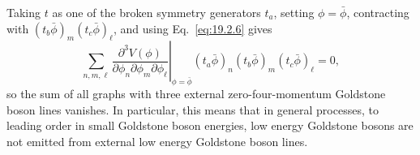 Taking $t$ as one of the broken symmetry generators $t_a$, setting
$\phi=\bar\phi$, contracting with
$(t_b\bar\phi)_m(t_c\bar\phi)_\ell$, and using
Eq.~\eqref{eq:19.2.6} gives
\begin{equation}
 \left.
 \sum_{n,m,\ell}
 \frac{\partial^3V(\phi)}
 {\partial\phi_n\partial\phi_m\partial\phi_\ell}
 \right|_{\phi=\bar\phi}
 (t_a\bar\phi)_n(t_b\bar\phi)_m(t_c\bar\phi)_\ell=0,
 \tag{19.2.56}\label{eq:19.2.56}
\end{equation}
so the sum of all graphs with three external zero-four-momentum Goldstone
boson lines vanishes. In particular, this means that in general processes,
to leading order in small Goldstone boson energies, low energy Goldstone
bosons are not emitted from external low energy Goldstone boson lines.

